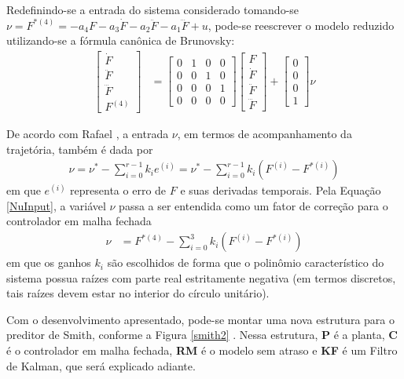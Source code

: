 Redefinindo-se a entrada do sistema considerado tomando-se $\nu = F^{*(4)} = -a_4 F - a_3 \dot{F} - a_2 \ddot{F} - a_1 \dddot{F} + u$, pode-se reescrever o modelo reduzido utilizando-se a fórmula canônica de Brunovsky:
\begin{align}
\left [ 
\begin{array}{c}
\dot{F} \\ \ddot{F} \\ \dddot{F} \\ F^{(4)}
\end{array}
\right] &= \left[
\begin{array}{cccc}
0 & 1 & 0 & 0 \\
0 & 0 & 1 & 0 \\
0 & 0 & 0 & 1 \\
0 & 0 & 0 & 0
\end{array}
\right] \left[
\begin{array}{c}
F \\ \dot{F} \\ \ddot{F} \\ \dddot{F}
\end{array}
\right] + \left[
\begin{array}{c}
0 \\ 0 \\ 0 \\ 1
\end{array}
\right] \nu
\end{align}

De acordo com Rafael \cite{rafaelMestrado}, a entrada $\nu$, em termos de acompanhamento da trajetória, também é dada por
\begin{align}
 \label{NuInput}
 \nu = \nu^{*} - \sum_{i=0}^{r-1} k_i e^{(i)} = \nu^{*} - \sum_{i=0}^{r-1} k_i \left(F^{(i)} - F^{*(i)}\right)
\end{align} em que $e^{(i)}$ representa o erro de $F$ e suas derivadas temporais. Pela Equação \ref{NuInput}, a variável $\nu$ passa a ser entendida como um fator de correção para o controlador em malha fechada
\begin{align}
\nu &= F^{*(4)} - \sum_{i=0}^{3} k_i \left( F^{(i)} - F^{*(i)}\right)
\end{align} em que os ganhos $k_i$ são escolhidos de forma que o polinômio característico do sistema possua raízes com parte real estritamente negativa (em termos discretos, tais raízes devem estar no interior do círculo unitário).

Com o desenvolvimento apresentado, pode-se montar uma nova estrutura para o preditor de Smith, conforme a Figura \ref{smith2} . Nessa estrutura, \textbf{P} é a planta, \textbf{C} é o controlador em malha fechada, \textbf{RM} é o modelo sem atraso e \textbf{KF} é um Filtro de Kalman, que será explicado adiante. 

